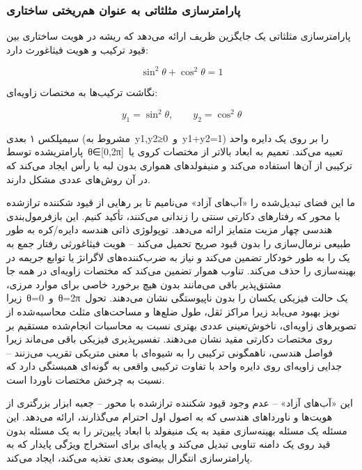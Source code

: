 \documentclass[12pt, a4paper]{article}
\begin{document}
\subsubsection{پارامترسازی مثلثاتی به عنوان هم‌ریختی ساختاری}

پارامترسازی مثلثاتی یک جایگزین ظریف ارائه می‌دهد که ریشه در هویت ساختاری بین قیود ترکیب و هویت فیثاغورث دارد:

\begin{equation}
\sin^{2}\theta+\cos^{2}\theta=1
\end{equation}

نگاشت ترکیب‌ها به مختصات زاویه‌ای:

\begin{equation}
y_{1}=\sin^{2}\theta,\qquad y_{2}=\cos^{2}\theta
\end{equation}

سیمپلکس ۱ بعدی (مشروط به y1,y2≥0 و y1+y2=1) را بر روی یک دایره واحد پارامتریشده توسط θ∈[0,2π] تعبیه می‌کند. تعمیم به ابعاد بالاتر از مختصات کروی یا ترکیبی از آن‌ها استفاده می‌کند و منیفولدهای همواری بدون لبه یا رأس ایجاد می‌کند که در آن روش‌های عددی مشکل دارند.

ما این فضای تبدیل‌شده را «آب‌های آزاد» می‌نامیم تا بر رهایی از قیود شکننده ترازشده با محور که رفتارهای دکارتی سنتی را زندانی می‌کنند، تأکید کنیم. این بازفرمول‌بندی هندسی چهار مزیت متمایز ارائه می‌دهد. توپولوژی ذاتی هندسه دایره/کره به طور طبیعی نرمال‌سازی را بدون قیود صریح تحمیل می‌کند – هویت فیثاغورثی رفتار جمع به یک را به طور خودکار تضمین می‌کند و نیاز به ضرب‌کننده‌های لاگرانژ یا توابع جریمه در بهینه‌سازی را حذف می‌کند. تناوب هموار تضمین می‌کند که مختصات زاویه‌ای در همه جا مشتق‌پذیر باقی می‌مانند بدون هیچ برخورد خاصی برای موارد مرزی، زیرا θ=0 و θ=2π یک حالت فیزیکی یکسان را بدون ناپیوستگی نشان می‌دهند. تحول نویز بهبود می‌یابد زیرا مراکز ثقل، طول ضلع‌ها و مساحت‌های مثلث محاسبه‌شده از تصویرهای زاویه‌ای، ناخوش‌تعینی عددی بهتری نسبت به محاسبات انجام‌شده مستقیم بر روی مختصات دکارتی مقید نشان می‌دهند. تفسیرپذیری فیزیکی باقی می‌ماند زیرا فواصل هندسی، ناهمگونی ترکیبی را به شیوه‌ای با معنی متریکی تقریب می‌زنند – جدایی زاویه‌ای روی دایره واحد با تفاوت ترکیبی واقعی به گونه‌ای همبستگی دارد که نسبت به چرخش مختصات ناوردا است.

این «آب‌های آزاد» – عدم وجود قیود شکننده ترازشده با محور – جعبه ابزار بزرگتری از هویت‌ها و ناورداهای هندسی که به اصول اول احترام می‌گذارند، ارائه می‌دهد. این مسئله یک مسئله بهینه‌سازی مقید به یک منیفولد با ابعاد پایین‌تر را به یک مسئله بدون قید روی یک دامنه تناوبی تبدیل می‌کند و پایه‌ای برای استخراج ویژگی پایدار که به پارامترسازی انتگرال بیضوی بعدی تغذیه می‌کند، ایجاد می‌کند.
\end{document}
